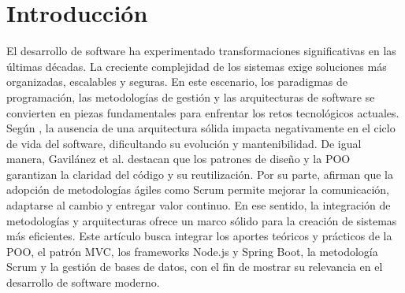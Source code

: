 \section{Introducción}
El desarrollo de software ha experimentado transformaciones significativas en las últimas décadas. La creciente complejidad de los sistemas exige soluciones más organizadas, escalables y seguras. En este escenario, los paradigmas de programación, las metodologías de gestión y las arquitecturas de software se convierten en piezas fundamentales para enfrentar los retos tecnológicos actuales. Según \cite{scrum}, la ausencia de una arquitectura sólida impacta negativamente en el ciclo de vida del software, dificultando su evolución y mantenibilidad. De igual manera, Gavilánez et al. \cite{poo} destacan que los patrones de diseño y la POO garantizan la claridad del código y su reutilización. Por su parte, \cite{nodejs_springboot} afirman que la adopción de metodologías ágiles como Scrum permite mejorar la comunicación, adaptarse al cambio y entregar valor continuo. En ese sentido, la integración de metodologías y arquitecturas ofrece un marco sólido para la creación de sistemas más eficientes. Este artículo busca integrar los aportes teóricos y prácticos de la POO, el patrón MVC, los frameworks Node.js y Spring Boot, la metodología Scrum y la gestión de bases de datos, con el fin de mostrar su relevancia en el desarrollo de software moderno.
